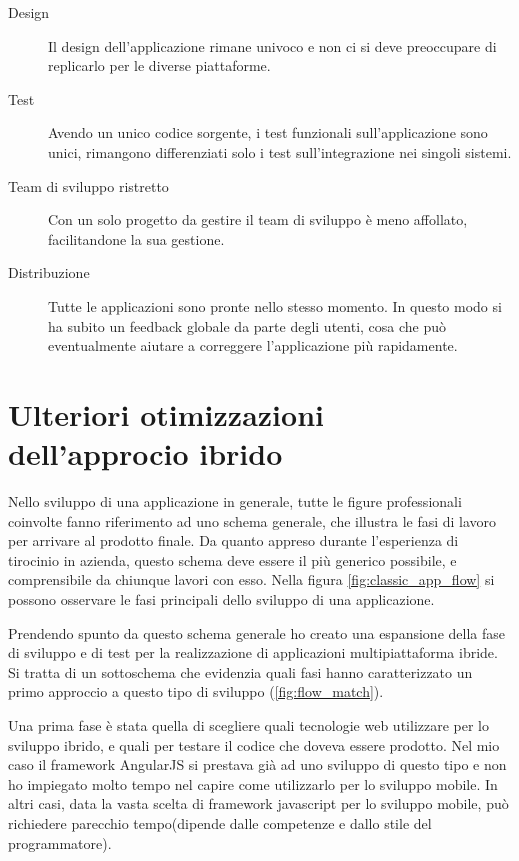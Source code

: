 \begin{description}
	\item[Design] Il design dell'applicazione rimane univoco e non ci si deve preoccupare di replicarlo per le diverse piattaforme.
	\item[Test] Avendo un unico codice sorgente, i test funzionali sull'applicazione sono unici, rimangono differenziati solo i test sull'integrazione nei singoli sistemi.
	\item[Team di sviluppo ristretto] Con un solo progetto da gestire il team di sviluppo è meno affollato, facilitandone la sua gestione.
	\item[Distribuzione] Tutte le applicazioni sono pronte nello stesso momento. In questo modo si ha subito un feedback globale da parte degli utenti, cosa che può eventualmente aiutare a correggere l'applicazione più rapidamente.
\end{description}

\section{Ulteriori otimizzazioni dell'approcio ibrido}

Nello sviluppo di una applicazione in generale, tutte le figure professionali coinvolte fanno riferimento ad uno schema generale, che illustra le fasi di lavoro per arrivare al prodotto finale. Da quanto appreso durante l'esperienza di tirocinio in azienda, questo schema deve essere il più generico possibile, e comprensibile da chiunque lavori con esso. Nella figura \ref{fig:classic_app_flow} si possono osservare le fasi principali dello sviluppo di una applicazione.

Prendendo spunto da questo schema generale ho creato una espansione della fase di sviluppo e di test per la realizzazione di applicazioni multipiattaforma ibride. Si tratta di un sottoschema che evidenzia quali fasi hanno caratterizzato un primo approccio a questo tipo di sviluppo (\ref{fig:flow_match}).

Una prima fase è stata quella di scegliere quali tecnologie web utilizzare per lo sviluppo ibrido, e quali per testare il codice che doveva essere prodotto. Nel mio caso il framework AngularJS si prestava già ad uno sviluppo di questo tipo e non ho impiegato molto tempo nel capire come utilizzarlo per lo sviluppo mobile. In altri casi, data la vasta scelta di framework javascript per lo sviluppo mobile, può richiedere parecchio tempo(dipende dalle competenze e dallo stile del programmatore).


